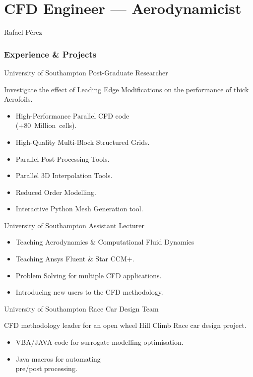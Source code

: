 \documentclass[fontsize=10pt]{tccv}
\begin{document}
\part{CFD Engineer --- Aerodynamicist}{Rafael P\'erez}

\section{Experience \& Projects}
\begin{eventlist}
     {University of Southampton}
     {Post-Graduate Researcher}

Investigate the effect of Leading Edge Modifications on
the performance of thick Aerofoils.
\begin{itemize}
	\itemsep -1pt
	\item High-Performance Parallel CFD code \\ (+80~Million~cells).
	\item High-Quality Multi-Block Structured Grids.
	\item Parallel Post-Processing Tools.
	\item Parallel 3D Interpolation Tools.
	\item Reduced Order Modelling.
	\item Interactive Python Mesh Generation tool.
\end{itemize}

	{University of Southampton}
	{Assistant Lecturer}

\begin{itemize}
	\itemsep -1pt
	\item Teaching Aerodynamics \& Computational Fluid Dynamics
	\item Teaching Ansys Fluent \& Star CCM+.
	\item Problem Solving for multiple CFD applications.
	\item Introducing new users to the CFD methodology.
\end{itemize}

     {University of Southampton}
     {Race Car Design Team}

     CFD methodology leader for an open wheel Hill Climb Race car design project.
     \begin{itemize}
	\itemsep -1pt
     	\item VBA/JAVA code for surrogate modelling optimisation.
     	\item Java macros for automating\\ pre/post processing.
     \end{itemize}


\end{eventlist}
\end{document}
